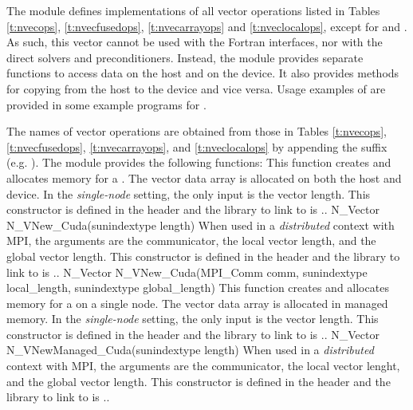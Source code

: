 The {\nveccuda} module defines implementations of all vector operations listed
in Tables \ref{t:nvecops}, \ref{t:nvecfusedops}, \ref{t:nvecarrayops}
and \ref{t:nveclocalops}, except
for  and .
As such, this vector cannot be used with the {\sundials} Fortran interfaces,
nor with the {\sundials} direct solvers and preconditioners. Instead,
the {\nveccuda} module provides separate functions to access data on the host
and on the device. It also provides methods for copying from the host to
the device and vice versa. Usage examples of {\nveccuda} are provided in
some example programs for {\cvode} \cite{cvode_ex}.

The names of vector operations are obtained from those in Tables \ref{t:nvecops},
\ref{t:nvecfusedops}, \ref{t:nvecarrayops}, and \ref{t:nveclocalops}
by appending the suffix 
(e.g. ). The module {\nveccuda} provides the following
functions:
{
  This function creates and allocates memory for a {\cuda} .
  The vector data array is allocated on both the host and device.
}
{
  In the \textit{single-node} setting, the only input is the vector length. This
  constructor is defined in the header  and the library to
  link to is ..
}
{
  N\_Vector N\_VNew\_Cuda(sunindextype length)
}
{
  When used in a \textit{distributed} context with MPI, the arguments are the
  {\mpi} communicator, the local vector length, and the global vector length.
  This constructor is defined in the header  and
  the library to link to is ..
}
{
  N\_Vector N\_VNew\_Cuda(MPI\_Comm comm, sunindextype local\_length,
  sunindextype global\_length)
}
{
  This function creates and allocates memory for a {\cuda} 
  on a single node. The vector data array is allocated in managed memory.
}
{
  In the \textit{single-node} setting, the only input is the vector length. This
  constructor is defined in the header  and the library to
  link to is ..
}
{
  N\_Vector N\_VNewManaged\_Cuda(sunindextype length)
}
{
  When used in a \textit{distributed} context with MPI, the arguments are the
  {\mpi} communicator, the local vector lenght, and the global vector length.
  This constructor is defined in the header  and
  the library to link to is ..
}
